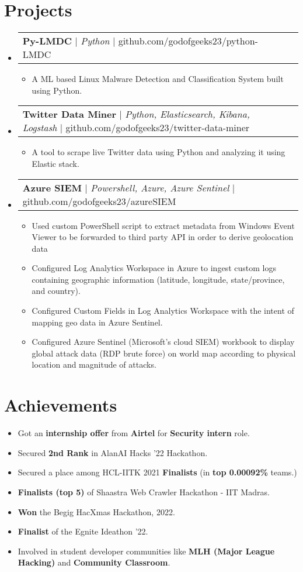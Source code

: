 \documentclass[a4paper,20pt]{article}
\makeatletter
\newcommand{\resumeItem}[1]{
  \item\small{
    {#1 \vspace{-2pt}}
  }
}
\newcommand{\resumeProjectHeading}[2]{
    \item
    \begin{tabular*}{1.001\textwidth}{l@{\extracolsep{\fill}}r}
      \small#1 & \textbf{\small }\\
    \end{tabular*}\vspace{-7pt}
    

}
\newcommand{\resumeSubHeadingListStart}{\begin{itemize}[leftmargin=0.0in, label={}]}
\newcommand{\resumeSubHeadingListEnd}{\end{itemize}}
\newcommand{\resumeItemListStart}{\begin{itemize}}
\newcommand{\resumeItemListEnd}{\end{itemize}\vspace{-5pt}}
\makeatother
\begin{document}
\section{Projects}
    \vspace{-5pt}
    \resumeSubHeadingListStart
    \resumeProjectHeading
          {\textbf{Py-LMDC} $|$ \emph{Python} $|$ {github.com/godofgeeks23/python-LMDC}}{temp}
          \resumeItemListStart
            \resumeItem{A ML based Linux Malware Detection and Classification
System built using Python.}
          \resumeItemListEnd
    \vspace{-13pt}
      \resumeProjectHeading
          {\textbf{Twitter Data Miner} $|$ \emph{Python, Elasticsearch, Kibana, Logstash}  $|$ {github.com/godofgeeks23/twitter-data-miner}}{temp}
          \resumeItemListStart
            \resumeItem{A tool to scrape live Twitter data using Python and analyzing it using Elastic stack.}
          \resumeItemListEnd
    \vspace{-13pt}
      \resumeProjectHeading
          {\textbf{Azure SIEM} $|$ \emph{Powershell, Azure, Azure Sentinel}  $|$ {github.com/godofgeeks23/azureSIEM}}{temp}
          \resumeItemListStart
            \resumeItem{Used custom PowerShell script to extract metadata from Windows Event Viewer to be forwarded to third party API in order to derive geolocation data}
            \resumeItem{Configured Log Analytics Workspace in Azure to ingest custom logs containing geographic information (latitude, longitude, state/province, and country).}
            \resumeItem{Configured Custom Fields in Log Analytics Workspace with the intent of mapping geo data in Azure Sentinel.}
            \resumeItem{Configured Azure Sentinel (Microsoft's cloud SIEM) workbook to display global attack data (RDP brute force) on world map according to physical location and magnitude of attacks.}
          \resumeItemListEnd
    \resumeSubHeadingListEnd
\vspace{-15pt}

%
\section{Achievements}
 \begin{itemize}[leftmargin=0.15in, label={}]
    \resumeItemListStart
        \resumeItem{Got an \textbf{internship offer} from \textbf{Airtel} for \textbf{Security intern} role.}
        \resumeItem{Secured \textbf{2nd Rank} in AlanAI Hacks '22 Hackathon.}
        \resumeItem{Secured a place among HCL-IITK 2021 \textbf{Finalists} (in \textbf{top 0.00092\%} teams.)}
        \resumeItem{\textbf{Finalists (top 5)} of Shaastra Web Crawler Hackathon - IIT Madras.}
        \resumeItem{\textbf{Won} the Begig HacXmas Hackathon, 2022.}
        \resumeItem{\textbf{Finalist} of the Egnite Ideathon '22.}
        \resumeItem{Involved in student developer communities like \textbf{MLH (Major League Hacking)} and \textbf{Community Classroom}.}
      \resumeItemListEnd
 \end{itemize}
 \vspace{-16pt}
\end{document}

